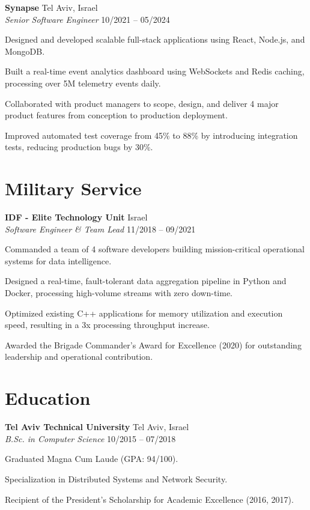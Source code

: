 \documentclass[10pt,a4paper]{article}
\newcommand{\cventry}[4]{
  \noindent
  {\bfseries\color{primary}#1} \hfill {\color{secondary}\small#3} \\{}
  {\itshape\color{secondary}#2} \hfill {\color{lighttext}\small#4}
  \par\vspace{0.3ex}
}
\begin{document}
\vspace{0.4em}

\cventry{Synapse}{Senior Software Engineer}{Tel Aviv, Israel}{10/2021 -- 05/2024}
\begin{cvitems}
  \item Designed and developed scalable full-stack applications using React, Node.js, and MongoDB.
  \item Built a real-time event analytics dashboard using WebSockets and Redis caching, processing over 5M telemetry events daily.
  \item Collaborated with product managers to scope, design, and deliver 4 major product features from conception to production deployment.
  \item Improved automated test coverage from 45\% to 88\% by introducing integration tests, reducing production bugs by 30\%.
\end{cvitems}

\section*{Military Service}

\cventry{IDF - Elite Technology Unit}{Software Engineer \& Team Lead}{Israel}{11/2018 -- 09/2021}
\begin{cvitems}
  \item Commanded a team of 4 software developers building mission-critical operational systems for data intelligence.
  \item Designed a real-time, fault-tolerant data aggregation pipeline in Python and Docker, processing high-volume streams with zero down-time.
  \item Optimized existing C++ applications for memory utilization and execution speed, resulting in a 3x processing throughput increase.
  \item Awarded the Brigade Commander's Award for Excellence (2020) for outstanding leadership and operational contribution.
\end{cvitems}

\section*{Education}

\cventry{Tel Aviv Technical University}{B.Sc. in Computer Science}{Tel Aviv, Israel}{10/2015 -- 07/2018}
\begin{cvitems}
  \item Graduated Magna Cum Laude (GPA: 94/100).
  \item Specialization in Distributed Systems and Network Security.
  \item Recipient of the President's Scholarship for Academic Excellence (2016, 2017).
\end{cvitems}
\end{document}
